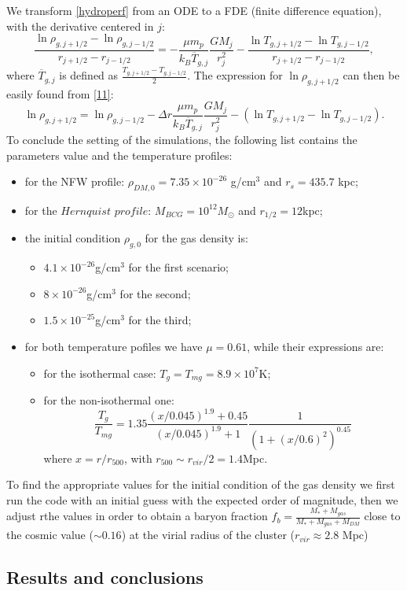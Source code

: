 \documentclass{article}
\begin{document}
We transform \eqref{hydroperf} from an ODE to a FDE (finite difference equation), with the derivative centered in $j$:
\begin{equation}\label{11}
	\frac{\ln \rho_{g,j+1/2}-\ln \rho_{g,j-1/2}}{r_{j+1/2}-r_{j-1/2}}=-\frac{\mu m_{p}}{k_{B}\overline{T}_{g,j}}\frac{GM_{j}}{r_{j}^{2}}-\frac{\ln T_{g,j+1/2}-\ln T_{g,j-1/2}}{r_{j+1/2}-r_{j-1/2}},
\end{equation}
where $\overline{T}_{g,j}$ is defined as $\frac{T_{g,j+1/2}-T_{g,j-1/2}}{2}$. The expression for $\ln \rho_{g,j+1/2}$ can then be easily found from \eqref{11}:
\begin{equation}
	\ln\rho_{g,j+1/2}=\ln\rho_{g,j-1/2}-\Delta r\frac{\mu m_{p}}{k_{B}\overline{T}_{g,j}}\frac{GM_{j}}{r_{j}^{2}}-(\ln T_{g,j+1/2}-\ln T_{g,j-1/2}).
\end{equation}
To conclude the setting of the simulations, the following list contains the parameters value and the temperature profiles:
\begin{itemize}
	\item for the NFW profile: $\rho_{DM,0}=7.35\times 10^{-26}$ g/cm$^{3}$ and $r_{s}=435.7$ kpc;
	\item for the $Hernquist$ $ profile$: $M_{BCG}=10^{12} M_{\odot}$ and $r_{1/2}=12$kpc;
	\item the initial condition $\rho_{g,0}$ for the gas density is: \begin{itemize}
		\item $4.1\times 10^{-26}$g/cm$^{3}$ for the first scenario;
		\item $8\times 10^{-26}$g/cm$^{3}$ for the second;
		\item $1.5\times 10^{-25}$g/cm$^{3}$ for the third;
	\end{itemize}
	\item for both temperature pofiles we have $\mu=0.61$, while their expressions are:
	\begin{itemize}
		\item for the isothermal case: $T_{g}=T_{mg}=8.9\times 10^{7}$K;
		\item for the non-isothermal one:
		\begin{equation}
			\frac{T_{g}}{T_{mg}}=1.35\frac{(x/0.045)^{1.9}+0.45}{(x/0.045)^{1.9}+1}\frac{1}{(1+(x/0.6)^{2})^{0.45}}
		\end{equation}
		where $x=r/r_{500}$, with $r_{500}\sim r_{vir}/2=1.4$Mpc.
	\end{itemize}
\end{itemize}
To find the appropriate values for the initial condition of the gas density we first run the code with an initial guess with the expected order of magnitude, then we adjust rthe values in order
to obtain a baryon fraction $f_{b}=\frac{M_{*}+M_{gas}}{M_{*}+M_{gas}+M_{DM}}$ close to the cosmic value ($\sim 0.16$) at the virial radius of the cluster ($r_{vir}\approx 2.8$ Mpc)

\subsection{Results and conclusions}
\end{document}
